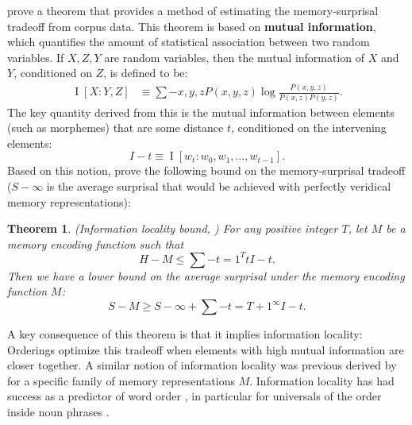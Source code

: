 \documentclass[11pt,letterpaper]{article}
\newcommand{\key}[1]{\textbf{#1}}
\newcounter{theorem}
\newtheorem{thm}[theorem]{Theorem}
\begin{document}
\citet{Hahn2020modeling} prove a theorem that provides a method of estimating the memory-surprisal tradeoff from corpus data.
This theorem is based on \key{mutual information}, which quantifies the amount of statistical association between two random variables.
If $X, Z, Y$ are random variables, then the mutual information of $X$ and $Y$, conditioned on $Z$, is defined to be:
\begin{align}
\label{eq:mi}
    \operatorname{I}[X:Y,Z] &\equiv \sum-{x,y,z} P(x,y,z) \log \frac{P(x,y,z)}{P(x,z)P(y,z)}. %
\end{align}
The key quantity derived from this is the mutual information between elements (such as morphemes) that are some distance $t$, conditioned on the intervening elements:
\begin{equation*}
    I-t \equiv \operatorname{I}[w_t : w_0 , w_1, \dots, w_{t-1}].
\end{equation*}
Based on this notion, \citet{Hahn2020modeling}  prove the following bound on the memory-surprisal tradeoff ($S-\infty$ is the average surprisal that would be achieved with perfectly veridical memory representations):
\begin{thm}\label{prop:suboptimal}(Information locality bound, \citet{Hahn2020modeling})
For any positive integer $T$, let $M$ be a memory encoding function such that
\begin{equation}
\label{eq:memory-bound}
H-M \le \sum-{t=1}^T t I-t.
\end{equation}
Then we have a lower bound on the average surprisal under the memory encoding function $M$:
\begin{equation}
\label{eq:surprisal-bound}
S-M \ge S-\infty + \sum-{t=T+1}^\infty I-t.
\end{equation}
\end{thm}


A key consequence of this theorem is that it implies information locality:
Orderings optimize this tradeoff when elements with high mutual information are closer together.
A similar notion of information locality was previous derived by \citet{futrell2020lossy} for a specific family of memory representations $M$.
Information locality has had success as a predictor of word order \citep{futrell2019information}, in particular for universals of the order inside noun phrases \citep{culbertson2020from,hahn-information-theoretic-2018,DBLP:conf/acl/FutrellDS20}.
\end{document}
